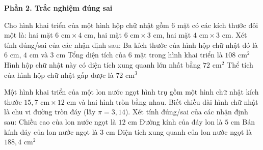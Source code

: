 \textbf{Phần 2. Trắc nghiệm đúng sai}

\begin{ex} %
Cho hình khai triển của một hình hộp chữ nhật gồm $6$ mặt có các kích thước đôi một là: hai mặt $6\text{ cm} \times 4\text{ cm}$, hai mặt $6\text{ cm} \times 3\text{ cm}$, hai mặt $4\text{ cm} \times 3\text{ cm}$. Xét tính đúng/sai của các nhận định sau:
\choiceTF
{\True Ba kích thước của hình hộp chữ nhật đó là $6\text{ cm}$, $4\text{ cm}$ và $3\text{ cm}$}
{\True Tổng diện tích của $6$ mặt trong hình khai triển là $108\text{ cm}^2$}
{Hình hộp chữ nhật này có diện tích xung quanh lớn nhất bằng $72\text{ cm}^2$}
{\True Thể tích của hình hộp chữ nhật gấp được là $72\text{ cm}^3$}
\end{ex}

\begin{ex} %
Một hình khai triển của một lon nước ngọt hình trụ gồm một hình chữ nhật kích thước $15{,}7\text{ cm} \times 12\text{ cm}$ và hai hình tròn bằng nhau. Biết chiều dài hình chữ nhật là chu vi đường tròn đáy (lấy $\pi = 3{,}14$). Xét tính đúng/sai của các nhận định sau:
\choiceTF
{\True Chiều cao của lon nước ngọt là $12\text{ cm}$}
{\True Đường kính của đáy lon là $5\text{ cm}$}
{Bán kính đáy của lon nước ngọt là $3\text{ cm}$}
{\True Diện tích xung quanh của lon nước ngọt là $188{,}4\text{ cm}^2$}
\end{ex}

